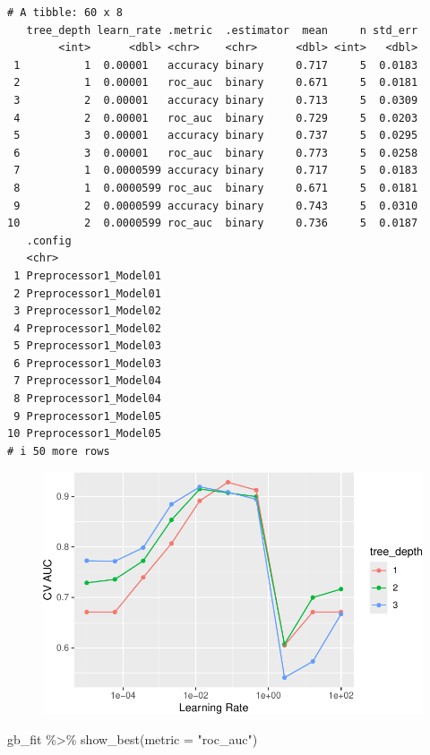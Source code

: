 \documentclass[
]{article}
\newenvironment{Shaded}{\begin{snugshade}}{\end{snugshade}}
\newcommand{\AttributeTok}[1]{\textcolor[rgb]{0.40,0.45,0.13}{#1}}
\newcommand{\FunctionTok}[1]{\textcolor[rgb]{0.28,0.35,0.67}{#1}}
\newcommand{\NormalTok}[1]{\textcolor[rgb]{0.00,0.23,0.31}{#1}}
\newcommand{\SpecialCharTok}[1]{\textcolor[rgb]{0.37,0.37,0.37}{#1}}
\newcommand{\StringTok}[1]{\textcolor[rgb]{0.13,0.47,0.30}{#1}}
\begin{document}
\begin{verbatim}
# A tibble: 60 x 8
   tree_depth learn_rate .metric  .estimator  mean     n std_err
        <int>      <dbl> <chr>    <chr>      <dbl> <int>   <dbl>
 1          1  0.00001   accuracy binary     0.717     5  0.0183
 2          1  0.00001   roc_auc  binary     0.671     5  0.0181
 3          2  0.00001   accuracy binary     0.713     5  0.0309
 4          2  0.00001   roc_auc  binary     0.729     5  0.0203
 5          3  0.00001   accuracy binary     0.737     5  0.0295
 6          3  0.00001   roc_auc  binary     0.773     5  0.0258
 7          1  0.0000599 accuracy binary     0.717     5  0.0183
 8          1  0.0000599 roc_auc  binary     0.671     5  0.0181
 9          2  0.0000599 accuracy binary     0.743     5  0.0310
10          2  0.0000599 roc_auc  binary     0.736     5  0.0187
   .config              
   <chr>                
 1 Preprocessor1_Model01
 2 Preprocessor1_Model01
 3 Preprocessor1_Model02
 4 Preprocessor1_Model02
 5 Preprocessor1_Model03
 6 Preprocessor1_Model03
 7 Preprocessor1_Model04
 8 Preprocessor1_Model04
 9 Preprocessor1_Model05
10 Preprocessor1_Model05
# i 50 more rows
\end{verbatim}

\begin{figure}[H]

{\centering \includegraphics{hw4_files/figure-pdf/unnamed-chunk-40-1.pdf}

}

\end{figure}

\begin{Shaded}
\begin{Highlighting}[]
\NormalTok{gb\_fit }\SpecialCharTok{\%\textgreater{}\%}
  \FunctionTok{show\_best}\NormalTok{(}\AttributeTok{metric =} \StringTok{"roc\_auc"}\NormalTok{)}
\end{Highlighting}
\end{Shaded}
\end{document}
